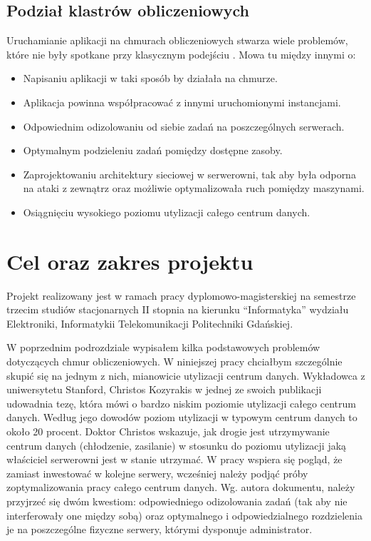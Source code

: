 \documentclass[10pt,a4paper,titlepage,twoside]{report}
\begin{document}
\subsection{Podział klastrów obliczeniowych}\indent \indent Uruchamianie aplikacji na chmurach obliczeniowych stwarza wiele problemów, które nie były spotkane przy klasycznym podejściu \cite{ad14}. Mowa tu między innymi o:
\begin{itemize}
	\item Napisaniu aplikacji w taki sposób by działała na chmurze.
	\item Aplikacja powinna współpracować z innymi uruchomionymi instancjami.
	\item Odpowiednim odizolowaniu od siebie zadań na poszczególnych serwerach.
	\item Optymalnym podzieleniu zadań pomiędzy dostępne zasoby.
	\item Zaprojektowaniu architektury sieciowej w serwerowni, tak aby była odporna na ataki z zewnątrz oraz możliwie optymalizowała ruch pomiędzy maszynami.
	\item Osiągnięciu wysokiego poziomu utylizacji całego centrum danych.
\end{itemize}

\section{Cel oraz zakres projektu}
\indent \indent Projekt realizowany jest w ramach pracy dyplomowo-magisterskiej na semestrze trzecim studiów stacjonarnych II stopnia na kierunku “Informatyka” wydziału Elektroniki, Informatykii Telekomunikacji Politechniki Gdańskiej.

W poprzednim podrozdziale wypisałem kilka podstawowych problemów dotyczących chmur obliczeniowych. W niniejszej pracy chciałbym szczególnie skupić się na jednym z nich, mianowicie utylizacji centrum danych. Wykładowca z uniwersytetu Stanford, Christos Kozyrakis w jednej ze swoich publikacji \cite{ad3} udowadnia tezę, która mówi o bardzo niskim poziomie utylizacji całego centrum danych. Według jego dowodów poziom utylizacji w typowym centrum danych to około 20 procent. Doktor Christos wskazuje, jak drogie jest utrzymywanie centrum danych (chłodzenie, zasilanie) w stosunku do poziomu utylizacji jaką właściciel serwerowni jest w stanie utrzymać. W pracy wspiera się pogląd, że zamiast inwestować w kolejne serwery, wcześniej należy podjąć próby zoptymalizowania pracy całego centrum danych. Wg. autora dokumentu, należy przyjrzeć się dwóm kwestiom: odpowiedniego odizolowania zadań (tak aby nie interferowały one między sobą) oraz optymalnego i odpowiedzialnego rozdzielenia je na poszczególne fizyczne serwery, którymi dysponuje administrator.
\end{document}
